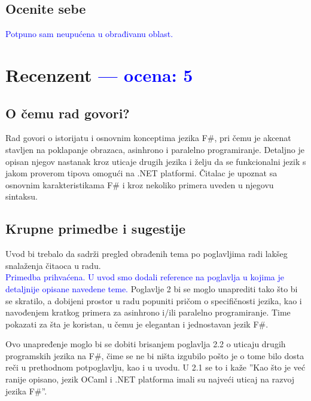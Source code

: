 \documentclass[a4paper]{report}
\newcommand{\odgovor}[1]{\textcolor{blue}{#1}}
\begin{document}
\section{Ocenite sebe}

\odgovor{Potpuno sam neupućena u obrađivanu oblast.}


\chapter{Recenzent \odgovor{--- ocena: 5} }


\section{O čemu rad govori?}
Rad govori o istorijatu i osnovnim konceptima jezika F\#, pri čemu je akcenat stavljen 
na poklapanje obrazaca, asinhrono i paralelno programiranje. Detaljno je opisan njegov
nastanak kroz uticaje drugih jezika i želju da se 
funkcionalni jezik s jakom proverom tipova omogući na .NET platformi.
Čitalac je upoznat sa osnovnim karakteristikama F\# i kroz nekoliko primera
uveden u njegovu sintaksu.


\section{Krupne primedbe i sugestije}
Uvod bi trebalo da sadrži pregled obrađenih tema po poglavljima 
radi lakšeg snalaženja čitaoca u radu.
\\ \odgovor {Primedba prihvaćena. U uvod smo dodali reference na poglavlja u kojima je detaljnije opisane navedene teme.}
Poglavlje 2 bi se moglo unaprediti tako što bi se skratilo, 
a dobijeni prostor u radu popuniti pričom o specifičnosti jezika,
kao i navođenjem kratkog primera za asinhrono i/ili paralelno programiranje. 
Time pokazati za šta je koristan, u čemu je elegantan i jednostavan jezik F\#.

Ovo unapređenje moglo bi se dobiti brisanjem poglavlja 2.2 o uticaju drugih 
programskih jezika na F\#, čime se ne bi ništa izgubilo
pošto je o tome bilo dosta reči u prethodnom potpoglavlju,
kao i u uvodu. U 2.1 se to i kaže ''Kao što je već ranije opisano, jezik OCaml i .NET platforma imali su najveći uticaj na razvoj jezika F\#''.
\end{document}
